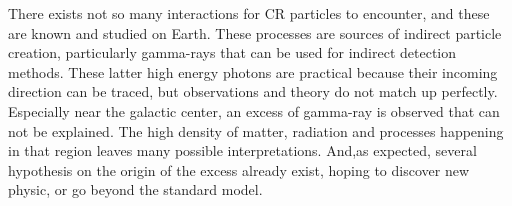 There exists not so many interactions for CR particles to encounter, and these are known and studied on Earth. These processes are sources of indirect particle creation, particularly gamma-rays that can be used for indirect detection methods. These latter high energy photons are practical because their incoming direction can be traced, but observations and theory do not match up perfectly. Especially near the galactic center, an excess of gamma-ray is observed that can not be explained. The high density of matter, radiation and processes happening in that region leaves many possible interpretations. And,as expected, several hypothesis on the origin of the excess already exist, hoping to discover new physic, or go beyond the standard model.


	
	
%
%
%
%
%
